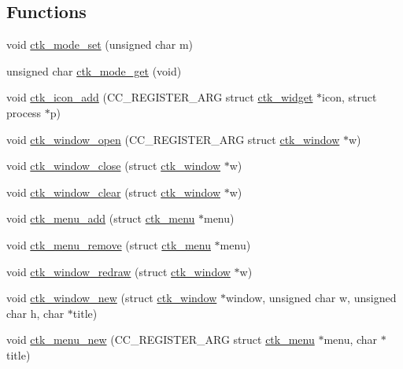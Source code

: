 \subsection*{Functions}
\begin{DoxyCompactItemize}
\item 
void \hyperlink{group__ctkappfunc_ga3ccdff3684bb5a499cafd4baa184a10e}{ctk\+\_\+mode\+\_\+set} (unsigned char m)
\item 
unsigned char \hyperlink{group__ctkappfunc_ga26d7427d7f920ce4e3293f1a8dd959f3}{ctk\+\_\+mode\+\_\+get} (void)
\item 
void \hyperlink{group__ctkappfunc_gafd7f717de0f57e23d03c13497b41efe4}{ctk\+\_\+icon\+\_\+add} (C\+C\+\_\+\+R\+E\+G\+I\+S\+T\+E\+R\+\_\+\+A\+R\+G struct \hyperlink{structctk__widget}{ctk\+\_\+widget} $\ast$icon, struct process $\ast$p)
\item 
void \hyperlink{group__ctkappfunc_ga2e85117f2716017f1ceaa83af221740d}{ctk\+\_\+window\+\_\+open} (C\+C\+\_\+\+R\+E\+G\+I\+S\+T\+E\+R\+\_\+\+A\+R\+G struct \hyperlink{structctk__window}{ctk\+\_\+window} $\ast$w)
\item 
void \hyperlink{group__ctkappfunc_ga6c19434a7d375ada9e59646f0fce3223}{ctk\+\_\+window\+\_\+close} (struct \hyperlink{structctk__window}{ctk\+\_\+window} $\ast$w)
\item 
void \hyperlink{group__ctkappfunc_ga610f37e797b2de0346cc731cdd7f6968}{ctk\+\_\+window\+\_\+clear} (struct \hyperlink{structctk__window}{ctk\+\_\+window} $\ast$w)
\item 
void \hyperlink{group__ctkappfunc_gab4f0dacbb8e4e5c7a54de9596c7df09f}{ctk\+\_\+menu\+\_\+add} (struct \hyperlink{structctk__menu}{ctk\+\_\+menu} $\ast$menu)
\item 
void \hyperlink{group__ctkappfunc_ga19d90b1b3233fdbc0530e268948cfa8e}{ctk\+\_\+menu\+\_\+remove} (struct \hyperlink{structctk__menu}{ctk\+\_\+menu} $\ast$menu)
\item 
void \hyperlink{group__ctkappfunc_gad1e0db0ea03dfb71ecc1f7a4f0d75674}{ctk\+\_\+window\+\_\+redraw} (struct \hyperlink{structctk__window}{ctk\+\_\+window} $\ast$w)
\item 
void \hyperlink{group__ctkappfunc_ga461fb81e49e0ffdb1d4eeab952a60e35}{ctk\+\_\+window\+\_\+new} (struct \hyperlink{structctk__window}{ctk\+\_\+window} $\ast$window, unsigned char w, unsigned char h, char $\ast$title)
\item 
void \hyperlink{group__ctkappfunc_ga7bd342f9787259933396efd7505c2a02}{ctk\+\_\+menu\+\_\+new} (C\+C\+\_\+\+R\+E\+G\+I\+S\+T\+E\+R\+\_\+\+A\+R\+G struct \hyperlink{structctk__menu}{ctk\+\_\+menu} $\ast$menu, char $\ast$title)

\end{DoxyCompactItemize}
